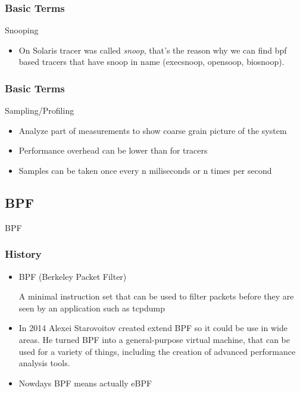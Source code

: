 \documentclass{beamer}
\begin{document}
\begin{frame}
  \frametitle{Basic Terms}
  \begin{block}{Snooping}
    \begin{itemize}
      \item On Solaris tracer was called \emph{snoop}, that's the reason why we can find bpf based tracers that have snoop in name (execsnoop, opensoop, biosnoop).
    \end{itemize}
  \end{block}
\end{frame}


\begin{frame}
  \frametitle{Basic Terms}
  \begin{block}{Sampling/Profiling}
    \begin{itemize}
      \item<1-> Analyze part of measurements to show coarse grain picture of the system
      \item<2-> Performance overhead can be lower than for tracers
      \item<3-> Samples can be taken once every n miliseconds or n times per second 
    \end{itemize}
  \end{block} 
\end{frame}


\subsection{BPF} %
\begin{frame}
  \begin{itemize}
      BPF
  \end{itemize}
\end{frame}

\begin{frame}
\frametitle{History}
\begin{itemize}
\item<1->
BPF (Berkeley Packet Filter)

A minimal instruction set that can be used to filter packets before they are seen by an application such
as tcpdump
\item<2->
In 2014 Alexei Starovoitov created extend BPF so it could be use in wide areas.
He turned BPF into a general-purpose virtual machine, that can be used for a variety of things,
including the creation of advanced performance analysis tools.
\item<3-> Nowdays BPF means actually eBPF
\end{itemize}
\end{frame}
\end{document}
